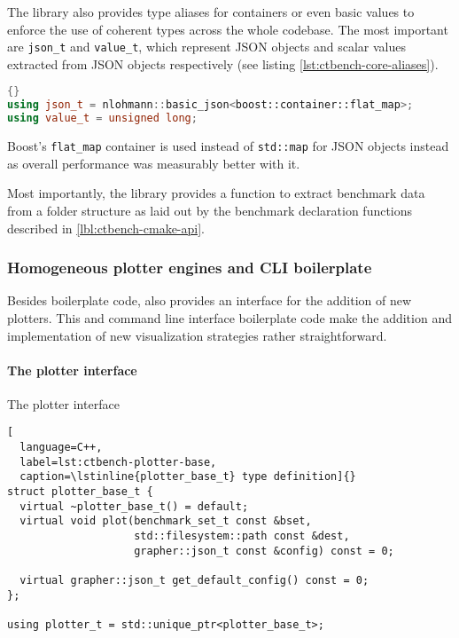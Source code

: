 \documentclass[../main]{subfiles}
\begin{document}
The \grapher library also provides type aliases for containers or even basic
values to enforce the use of coherent types across the whole codebase. The most
important are \lstinline{json_t} and \lstinline{value_t}, which represent JSON
objects and scalar values extracted from JSON objects respectively (see listing
\ref{lst:ctbench-core-aliases}).

\begin{lstlisting}[language=C++, label=lst:ctbench-core-aliases]{}
using json_t = nlohmann::basic_json<boost::container::flat_map>;
using value_t = unsigned long;
\end{lstlisting}

Boost's \lstinline{flat_map} container is used instead of \lstinline{std::map}
for JSON objects instead as overall performance was measurably better with it.

Most importantly, the \grapher library provides a function to extract benchmark
data from a folder structure as laid out by the benchmark declaration functions
described in \ref{lbl:ctbench-cmake-api}.

\subsubsection{Homogeneous plotter engines and CLI boilerplate}

Besides boilerplate code, \grapher also provides an interface for the addition
of new plotters. This and command line interface boilerplate code make the
addition and implementation of new visualization strategies rather
straightforward.

\paragraph{The plotter interface}

The plotter interface

\begin{lstlisting}[
  language=C++,
  label=lst:ctbench-plotter-base,
  caption=\lstinline{plotter_base_t} type definition]{}
struct plotter_base_t {
  virtual ~plotter_base_t() = default;
  virtual void plot(benchmark_set_t const &bset,
                    std::filesystem::path const &dest,
                    grapher::json_t const &config) const = 0;

  virtual grapher::json_t get_default_config() const = 0;
};

using plotter_t = std::unique_ptr<plotter_base_t>;
\end{lstlisting}
\end{document}
